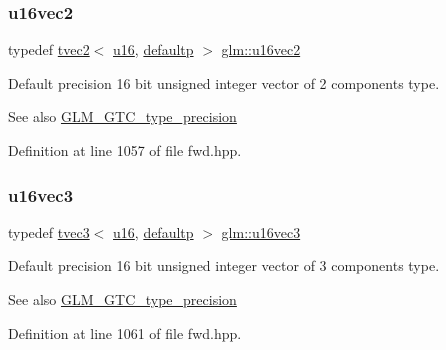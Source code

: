 \subsubsection{\texorpdfstring{u16vec2}{u16vec2}}
{\footnotesize\ttfamily typedef \mbox{\hyperlink{structglm_1_1tvec2}{tvec2}}$<$ \mbox{\hyperlink{group__gtc__type__precision_gae7a1571503f83d2264ddfa705a6b082a}{u16}}, \mbox{\hyperlink{namespaceglm_a0f04f086094c747d227af4425893f545a9d21ccd8b5a009ec7eb7677befc3bf51}{defaultp}} $>$ \mbox{\hyperlink{group__gtc__type__precision_ga10e8900b9610f930772aa55aee8e3121}{glm\+::u16vec2}}}

Default precision 16 bit unsigned integer vector of 2 components type. \begin{DoxySeeAlso}{See also}
\mbox{\hyperlink{group__gtc__type__precision}{G\+L\+M\+\_\+\+G\+T\+C\+\_\+type\+\_\+precision}} 
\end{DoxySeeAlso}


Definition at line 1057 of file fwd.\+hpp.

\mbox{\label{group__gtc__type__precision_ga947d0d003e016eaf2038d6843b427257}} 
\subsubsection{\texorpdfstring{u16vec3}{u16vec3}}
{\footnotesize\ttfamily typedef \mbox{\hyperlink{structglm_1_1tvec3}{tvec3}}$<$ \mbox{\hyperlink{group__gtc__type__precision_gae7a1571503f83d2264ddfa705a6b082a}{u16}}, \mbox{\hyperlink{namespaceglm_a0f04f086094c747d227af4425893f545a9d21ccd8b5a009ec7eb7677befc3bf51}{defaultp}} $>$ \mbox{\hyperlink{group__gtc__type__precision_ga947d0d003e016eaf2038d6843b427257}{glm\+::u16vec3}}}

Default precision 16 bit unsigned integer vector of 3 components type. \begin{DoxySeeAlso}{See also}
\mbox{\hyperlink{group__gtc__type__precision}{G\+L\+M\+\_\+\+G\+T\+C\+\_\+type\+\_\+precision}} 
\end{DoxySeeAlso}


Definition at line 1061 of file fwd.\+hpp.

\mbox{\label{group__gtc__type__precision_ga87d1f39c523b4d6d4de0c2778afe5474}} 
